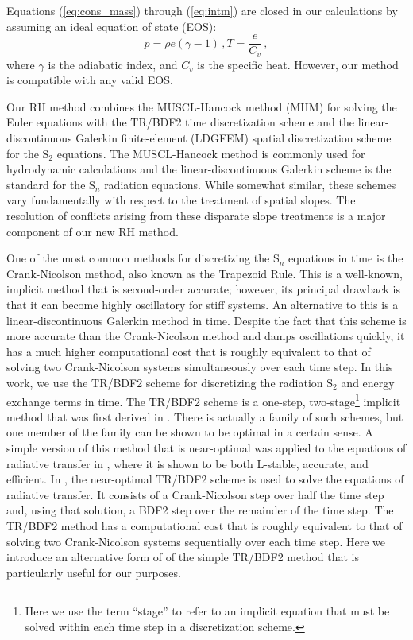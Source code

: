 \documentclass[preprint,12pt]{elsarticle}
\newcommand{\be}{\begin{equation}}
\newcommand{\ee}{\end{equation}}
\newcommand{\pec}{\, ,}
\newcommand{\lequ}[1]{\label{eq:#1}}
\newcommand{\requ}[1]{(\ref{eq:#1})}
\begin{document}
Equations \requ{cons_mass} through \requ{intm} are closed in our calculations by assuming an ideal equation of state (EOS):
\begin{subequations}
\be
p=\rho e (\gamma -1)
\lequ{pressure}
\pec
\ee
\be
T = \frac{e}{C_v} \pec
\lequ{mattemp}
\ee
\end{subequations}
where $\gamma$ is the adiabatic index, and $C_v$ is the specific heat.  However, our method is compatible with any valid EOS. 

Our RH method combines the MUSCL-Hancock method (MHM) for solving the Euler equations with the TR/BDF2 time discretization 
scheme and the linear-discontinuous Galerkin finite-element (LDGFEM) spatial discretization scheme for the S$_2$ equations.  
The MUSCL-Hancock method is commonly used for hydrodynamic calculations and the linear-discontinuous Galerkin scheme is the 
standard for the S$_n$ radiation equations.  While somewhat similar, these schemes vary fundamentally with respect to the 
treatment of spatial slopes.  The resolution of conflicts arising from these disparate 
slope treatments is a major component of our new RH method.

One of the most common methods for discretizing the S$_n$ equations in time is the Crank-Nicolson method, also known as the 
Trapezoid Rule. This is a well-known, implicit method that is second-order accurate; however, its principal drawback is that 
it can become highly oscillatory for stiff systems.  An alternative to this is a linear-discontinuous Galerkin method in time.  
Despite the fact that this scheme is more accurate than the Crank-Nicolson method and damps oscillations quickly, it has a 
much higher computational cost that is roughly equivalent to that of solving two Crank-Nicolson systems simultaneously over 
each time step.  In this work, we use the TR/BDF2 scheme for discretizing the radiation S$_2$ and energy exchange terms in time.  
The TR/BDF2 scheme is a one-step, two-stage\footnote{Here we use the term ``stage'' to refer to an implicit equation that must 
be solved within each time step in a discretization scheme.} implicit method that was first derived in \cite{bank}.   There is 
actually a family of such schemes, but one member of the family can be shown to be optimal in a certain sense.  A simple version 
of this method that is near-optimal was applied to the equations of radiative transfer in \cite{EM2011}, where it is shown to be 
both L-stable, accurate, and efficient.  In \cite{EM2011}, the near-optimal TR/BDF2 scheme is used to solve the equations of 
radiative transfer. It consists of a Crank-Nicolson step over half the time step and, using that solution, a BDF2 step over 
the remainder of the time step.  The TR/BDF2 method has a computational cost that is roughly equivalent to that of solving two 
Crank-Nicolson systems sequentially over each time step.  Here we introduce an alternative form of 
of the simple TR/BDF2 method that is particularly useful for our purposes.  
\end{document}
